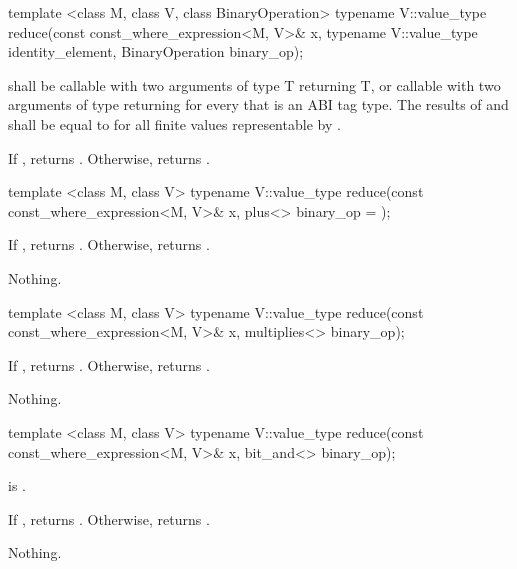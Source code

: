 \begin{itemdecl}
template <class M, class V, class BinaryOperation>
typename V::value_type reduce(const const_where_expression<M, V>& x, typename V::value_type identity_element,
                              BinaryOperation binary_op);
\end{itemdecl}
\begin{itemdescr}
  \pnum\requires {} shall be callable with two arguments of type \type T returning \type T, or callable with two arguments of type \simd[<T, A1>] returning \simd[<T, A1>] for every  that is an ABI tag type.
  The results of  and  shall be equal to  for all finite values  representable by .

  \pnum\returns
  If , returns .
  Otherwise, returns  .
\end{itemdescr}

\begin{itemdecl}
template <class M, class V>
typename V::value_type reduce(const const_where_expression<M, V>& x, plus<> binary_op = {});
\end{itemdecl}
\begin{itemdescr}
  \pnum\returns
  If , returns .
  Otherwise, returns  .

  \pnum\throws Nothing.
\end{itemdescr}

\begin{itemdecl}
template <class M, class V>
typename V::value_type reduce(const const_where_expression<M, V>& x, multiplies<> binary_op);
\end{itemdecl}
\begin{itemdescr}
  \pnum\returns
  If , returns .
  Otherwise, returns  .

  \pnum\throws Nothing.
\end{itemdescr}

\begin{itemdecl}
template <class M, class V>
typename V::value_type reduce(const const_where_expression<M, V>& x, bit_and<> binary_op);
\end{itemdecl}
\begin{itemdescr}
  \pnum\requires {} is \true.

  \pnum\returns
  If , returns .
  Otherwise, returns  .

  \pnum\throws Nothing.
\end{itemdescr}

